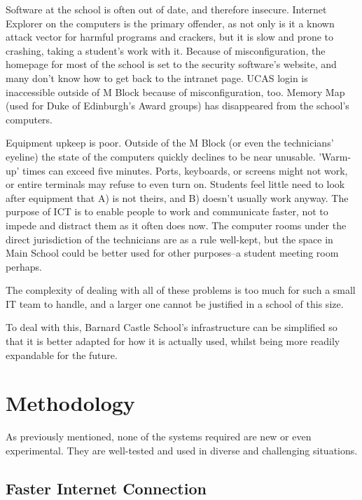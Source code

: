 \documentclass[a4paper,leqno,titlepage]{article}
\begin{document}
Software at the school is often out of date, and therefore insecure.
Internet Explorer on the computers is the primary offender, as not only is it
a known attack vector for harmful programs and crackers, but it is slow and
prone to crashing, taking a student's work with it. Because of misconfiguration,
the homepage for most of the school is set to the security software's website,
and many don't know how to get back to the intranet page. UCAS login is
inaccessible outside of M Block because of misconfiguration, too. Memory Map
(used for Duke of Edinburgh's Award groups) has disappeared from the school's
computers.


Equipment upkeep is poor. Outside of the M Block (or even the
technicians' eyeline) the state of the computers quickly declines to be near
unusable. 'Warm-up' times can exceed five minutes. Ports, keyboards, or screens
might not work, or entire terminals may refuse to even turn on.
Students feel little need to look after equipment that A) is not theirs,
and B) doesn't usually work anyway. The purpose of ICT is to enable
people to work and communicate faster, not to impede and distract them as it
often does now. The computer rooms under the direct jurisdiction of the
technicians are as a rule well-kept, but the space in Main School could be
better used for other purposes--a student meeting room perhaps.


The complexity of dealing with all of these problems is too much for such a
small IT team to handle, and a larger one cannot be justified in a school of
this size.


To deal with this, Barnard Castle School's infrastructure can be simplified
so that it is better adapted for how it is actually used, whilst being more
readily expandable for the future.




\section{Methodology}


As previously mentioned, none of the systems required are new or even
experimental. They are well-tested and used in diverse and challenging
situations.

\subsection{Faster Internet Connection}

\end{document}

